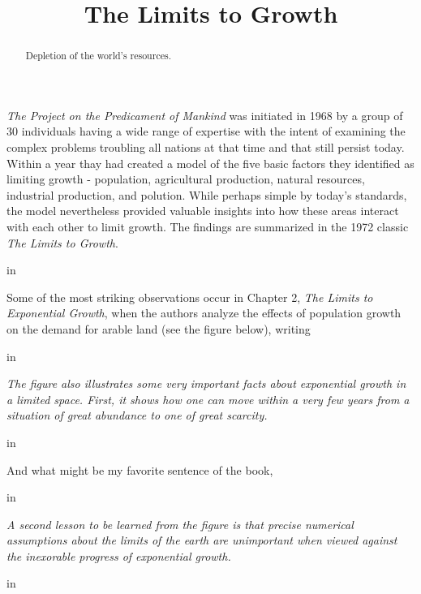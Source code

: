\documentclass{ximera}
\title{The Limits to Growth}
\newcommand{\pskip}{\vskip 0.1 in}
\begin{document}
\begin{abstract}
Depletion of the world's resources.
\end{abstract}
\maketitle


\emph{The Project on the Predicament of Mankind} was initiated in 1968 by a group of 30 individuals having a wide range of expertise with the intent of examining the complex problems troubling all nations at that time and that still persist today. Within a year thay had created a model of the five basic factors they identified as limiting growth  - population, agricultural production, natural resources, industrial production, and polution. While perhaps simple by today's standards, the model nevertheless provided valuable insights into how these areas interact with each other to limit growth. The findings are summarized in the 1972 classic \emph{The Limits to Growth}. 


\pskip

Some of the most striking observations occur in Chapter 2, \emph{The Limits to Exponential Growth}, when the authors analyze the effects of population growth on the demand for arable land (see the figure below), writing 

\pskip

\emph{The figure also illustrates some very important facts about exponential growth in a limited space. First, it shows how one can move within a very few years from a situation of great abundance to one of great scarcity.}  

\pskip

And what might be my favorite sentence of the book, 

\pskip

\emph{A second lesson to be learned from the figure is that precise numerical assumptions about the limits of the earth are unimportant when viewed against the inexorable progress of exponential growth.}

\pskip

 
\end{document}
